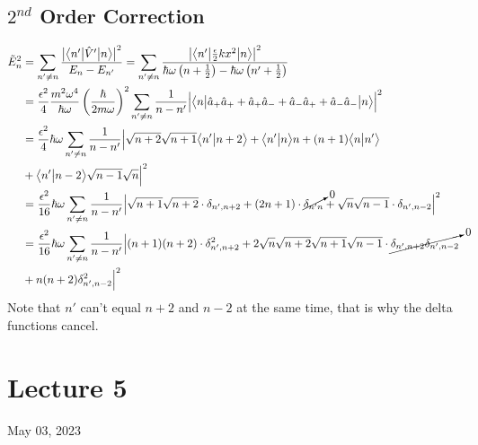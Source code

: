 \documentclass[12pt,fancychapters]{report}
\numberwithin{equation}{section}
\begin{document}
\subsection{$2^{nd}$ Order Correction}
\begin{align*}
	\tilde{E}^{2}_n & = \sum_{n'\neq n}\frac{\big|\big<n'\big|\hat{V}'\big|n\big>\big|^2}
	{E_n - E_{n'}}= \sum_{n'\neq n}\frac{\big|\big<n'\big|\frac{\epsilon}{2}kx^2\big|n\big>\big|^2}
	{\hbar\omega\left(n+\frac{1}{2}\right) - \hbar\omega\left(n'+\frac{1}{2}\right)}\\
	& = \frac{\epsilon^2}{4}\frac{m^2\omega^4}{\hbar\omega}\left(\frac{\hbar}{2m\omega}\right)^2
	\sum_{n'\neq n}\frac{1}{n-n'}\Big| \big<n\big|\hat{a}_+ \hat{a}_+ + \hat{a}_+ \hat{a}_- + 
	\hat{a}_- \hat{a}_+ +\hat{a}_-\hat{a}_-\big|n\big>\Big|^2\\
	& = \frac{\epsilon^2}{4}\hbar\omega \sum_{n'\neq n}\frac{1}{n-n'}\Big|
		\sqrt{n+2}\sqrt{n+1}\big<n'\big|n+2\big> + \big<n'\big|n\big>n
	+ (n+1)\big<n\big|n'\big>\\
  & + \big<n'\big|n-2\big>\sqrt{n-1}\sqrt{n}\Big|^2\\
	& = \frac{\epsilon^2}{16}\hbar\omega\sum_{n'\neq n}\frac{1}{n-n'}\Big|\sqrt{n+1}\sqrt{n+2}
	\cdot\delta_{n',n+2}+ (2n+1)\cdot\cancelto{0}{\delta_{n'n}}+ \sqrt{n}\sqrt{n-1}\cdot
	\delta_{n',n-2}\Big|^2\\
	& = \frac{\epsilon^2}{16}\hbar\omega\sum_{n'\neq n}\frac{1}{n-n'}\Big|(n+1)(n+2)\cdot\delta^2
	_{n', n+2} + 2\sqrt{n}\sqrt{n+2}\sqrt{n+1}\sqrt{n-1}\cdot\cancelto{0}{\delta_{n',n+2}
	\delta_{n',n-2}}\\
  & +n(n+2)\delta^2_{n',n-2}\Big|^2
\end{align*}
Note that $n'$ can't equal $n+2$ and $n-2$ at the same time, that is why the delta functions 
cancel.
\newpage
\section{Lecture 5}
May 03, 2023
\end{document}
